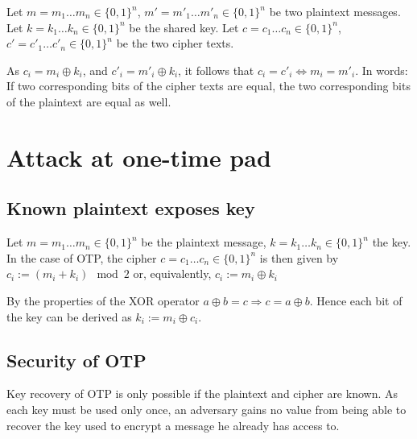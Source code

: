 \documentclass[a4paper]{scrreprt}
\begin{document}
Let $m = m_1 \dots m_n \in \{0, 1\}^n$, $m' = m'_1 \dots m'_n \in \{0, 1\}^n$
be two plaintext messages. Let $k = k_1 \dots k_n \in \{0, 1\}^n$ be the shared
key. Let $c = c_1 \dots c_n \in \{0, 1\}^n$, $c' = c'_1 \dots c'_n \in \{0,
1\}^n$ be the two cipher texts.

As $c_i = m_i \oplus k_i$, and $c'_i = m'_i \oplus k_i$, it follows that $c_i =
c'_i \Leftrightarrow m_i = m'_i$. In words: If two corresponding bits of the
cipher texts are equal, the two corresponding bits of the plaintext are equal
as well.

\section{Attack at one-time pad}

\subsection{Known plaintext exposes key}

Let $m = m_1 \dots m_n \in \{0, 1\}^n$ be the plaintext message, $k = k_1 \dots
k_n \in \{0, 1\}^n$ the key. In the case of OTP, the cipher $c = c_1 \dots c_n
\in \{0, 1\}^n$ is then given by $c_i := (m_i + k_i) \mod 2$ or, equivalently,
$c_i := m_i \oplus k_i$

By the properties of the XOR operator $a \oplus b = c \Rightarrow c = a \oplus
b$. Hence each bit of the key can be derived as $k_i := m_i \oplus c_i$.

\subsection{Security of OTP}

Key recovery of OTP is only possible if the plaintext and cipher are known.  As
each key must be used only once, an adversary gains no value from being able to
recover the key used to encrypt a message he already has access to.
\end{document}
